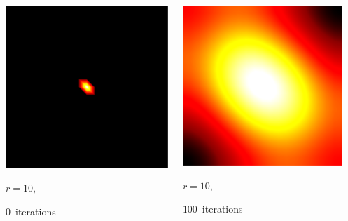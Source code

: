 \documentclass[aspectratio=169,t]{beamer}
\begin{document}
{\begin{columns}
\begin{column}{0.22\textwidth}
			\includegraphics[width=.85\textwidth]{data/synthetic_meshes/square_tesselation_2tri_Dirac_delta_10_v441_f800_funcvals_0iter.png}
			{\footnotesize 
				\par \vspace{-1mm} $r=10$, 
				\par \vspace{-1mm} $0$~iterations
			}
		\end{column}
		\begin{column}{0.22\textwidth}
			\centering
			\includegraphics[width=.85\textwidth]{data/synthetic_meshes/square_tesselation_2tri_Dirac_delta_10_v441_f800_funcvals_100iter.png}
			{\footnotesize 
				\par \vspace{-1mm} $r=10$, 
				\par \vspace{-1mm} $100$~iterations
			}
		\end{column}
		\begin{column}{0.17\textwidth}~\end{column}
	\end{columns}
}
\end{document}

